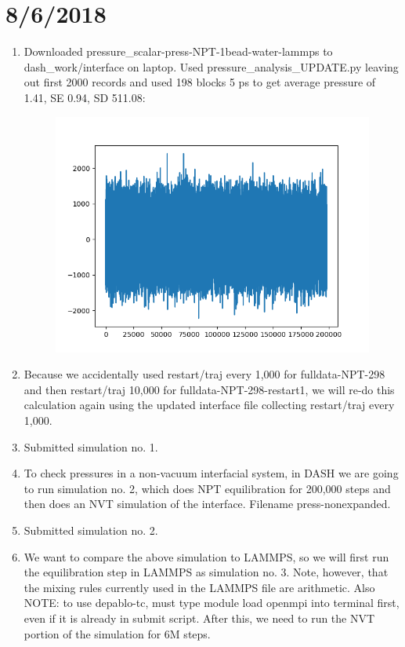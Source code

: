 \documentclass[12pt,reqno]{amsart}
\numberwithin{equation}{section}
\begin{document}
\section{8/6/2018}
\begin{enumerate}
\item Downloaded pressure\_scalar-press-NPT-1bead-water-lammps to dash\_work/interface on laptop.  Used pressure\_analysis\_UPDATE.py leaving out first 2000 records and used 198 blocks 5 ps to get average pressure of 1.41, SE 0.94, SD 511.08: 
\begin{figure}[H]
\centering
\includegraphics[scale=0.4]{pressures_press-NPT-1bead-water-lammps}
\end{figure}
\item Because we accidentally used restart/traj every 1,000 for fulldata-NPT-298 and then restart/traj 10,000 for fulldata-NPT-298-restart1, we will re-do this calculation again using the updated interface file collecting restart/traj every 1,000.  
\item Submitted simulation no. 1.  
\item To check pressures in a non-vacuum interfacial system, in DASH we are going to run simulation no. 2, which does NPT equilibration for 200,000 steps and then does an NVT simulation of the interface.  Filename press-nonexpanded.
\item Submitted simulation no. 2.  
\item We want to compare the above simulation to LAMMPS, so we will first run the equilibration step in LAMMPS as simulation no. 3.  Note, however, that the mixing rules currently used in the LAMMPS file are arithmetic.  Also NOTE: to use depablo-tc, must type module load openmpi into terminal first, even if it is already in submit script.  After this, we need to run the NVT portion of the simulation for 6M steps.  

\end{enumerate}
\end{document}
